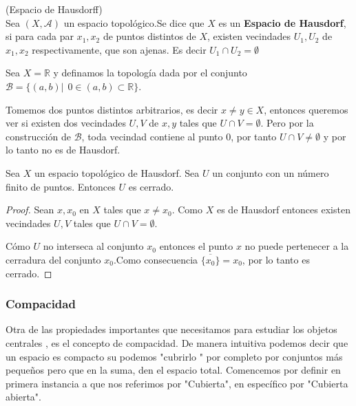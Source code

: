 \begin{definition}(Espacio de Hausdorff)
    \\Sea $(X,\mathcal{A})$ un espacio topológico.Se dice que $X$  es un \textbf{Espacio de Hausdorf}, si para cada par $x_1, x_2$ de puntos distintos de $X$, existen vecindades $U_1,U_2$ de $x_1,x_2$ respectivamente, que son ajenas. Es decir $U_1 \cap U_2 = \emptyset$
\end{definition}

\begin{example}
    Sea $X = \mathbb{R}$ y definamos la topología dada por el conjunto $\mathcal{B} = \{(a,b) | \hspace{5pt} 0 \in (a,b) \subset \mathbb{R} \}$.

    Tomemos dos puntos distintos arbitrarios, es decir $x \neq y \in X$, entonces queremos ver si existen dos vecindades $U,V$ de $x,y$ tales que $U \cap V = \emptyset$. Pero por la construcción de $\mathcal{B}$, toda vecindad contiene al punto 0, por tanto $U \cap V \neq \emptyset$ y por lo tanto no es de Hausdorf.
    
\end{example}

\begin{teorema}
    Sea $X$ un espacio topológico de Hausdorf. Sea $U$ un conjunto con un número finito de puntos. Entonces $U$ es cerrado.
\end{teorema}

\begin{proof}
    Sean $x,x_0$ en $X$ tales que $x \neq x_0$. Como $X$ es de Hausdorf entonces existen vecindades $U,V$ tales que $U \cap V = \emptyset$.

    Cómo $U$ no interseca al conjunto ${x_0}$ entonces el punto $x$ no puede pertenecer a la cerradura del conjunto ${x_0}$.Como consecuencia $\overline{\{x_0\}} = {x_0}$, por lo tanto es cerrado.
\end{proof}

\subsubsection{Compacidad}
Otra de las propiedades importantes que necesitamos para estudiar los objetos centrales , es el concepto de compacidad. De manera intuitiva podemos decir que un espacio es compacto su podemos "cubrirlo " por completo por conjuntos más pequeños pero que en la suma, den el espacio total.
Comencemos por definir en primera instancia a que nos referimos por "Cubierta", en específico por "Cubierta abierta".

